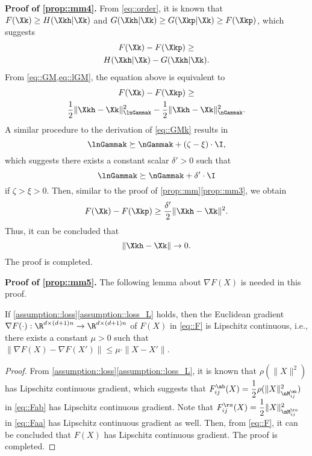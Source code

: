 \vspace{0.8em}
\noindent\textbf{Proof of \ref{prop::mm4}.\;} From \cref{eq::order}, it is known that $F(\Xk)\geq H(\Xkh|\Xk)$ and $G(\Xkh|\Xk)\geq G(\Xkp|\Xk) \geq F(\Xkp)$, which suggests
\begin{multline}
\nonumber
F(\Xk)-F(\Xkp) \geq\\ 
H(\Xkh|\Xk) - G(\Xkh|\Xk).
\end{multline}
From \cref{eq::GM,eq::lGM}, the equation above is equivalent to
\begin{multline}\label{eq::FkFkp}
F(\Xk)-F(\Xkp) \geq \\
\frac{1}{2}\|\Xkh-\Xk\|_{\lnGammak}^2 - \frac{1}{2}\|\Xkh-\Xk\|_{\nGammak}^2.
\end{multline}
A similar procedure to the derivation of \cref{eq::GMk} results in
\begin{equation}\label{eq::lGGk}
\lnGammak \succeq \nGammak + (\zeta-\xi)\cdot\I,
\end{equation}
which suggests there exists a constant scalar $\delta' > 0$ such that
\begin{equation}
\nonumber
\lnGammak \succeq \nGammak + \delta'\cdot\I
\end{equation}
if $\zeta>\xi > 0$. Then, similar to the proof of \cref{prop::mm}\ref{prop::mm3}, we obtain
\begin{equation}\label{eq::DFh}
F(\Xk)-F(\Xkp) \geq \frac{\delta'}{2}\|\Xkh-\Xk\|^2.
\end{equation}
Thus, it can be concluded that
\begin{equation}
	\|\Xkh-\Xk\| \rightarrow 0.
\end{equation}
The proof is completed.

\vspace{0.8em}
\noindent\textbf{Proof of \ref{prop::mm5}.\;} The following lemma about $\nabla F(X)$ is needed in this proof.

\begin{lemma}\label{prop::DF}
If \cref{assumption::loss}\ref{assumption::loss_L} holds, then the Euclidean gradient $\nabla F(\cdot):\R^{d\times(d+1)n}\rightarrow \R^{d\times(d+1)n}$ of $F(X)$ in \cref{eq::F} is Lipschitz continuous, i.e., there exists a constant $\mu > 0$ such that $\|\nabla F(X)-\nabla F(X')\|\leq \mu\cdot\|X-X'\|$.
\end{lemma}

\begin{proof}
From \cref{assumption::loss}\ref{assumption::loss_L}, it is known that $\rho(\|X\|^2)$ has Lipschitz continuous gradient, which suggests that $F_{ij}^{\ab}(X)=\dfrac{1}{2}\rho(\|X\|_{\nM_{ij}^{\ab}}^2)$ in \cref{eq::Fab} has Lipschitz continuous gradient. Note that $F_{ij}^{\aa}(X)=\dfrac{1}{2}\|X\|_{\nM_{ij}^{\aa}}^2$ in \cref{eq::Faa} has Lipschitz continuous gradient as well. Then, from \cref{eq::F}, it can be concluded that $F(X)$ has Lipschitz continuous gradient. The proof is completed.
\end{proof}

